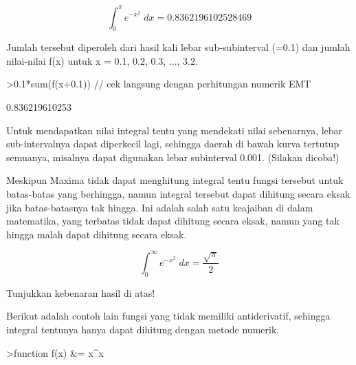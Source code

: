 \documentclass[a4paper,10pt]{article}
\begin{document}
\begin{eulernotebook}
\begin{eulercomment}
\begin{eulercomment}
\begin{eulercomment}
\begin{eulercomment}
\begin{eulercomment}
\begin{eulercomment}
\begin{eulercomment}
\begin{eulercomment}
\begin{eulercomment}
\begin{eulercomment}
\begin{eulercomment}
\begin{eulercomment}
\begin{eulercomment}
\begin{eulercomment}
\begin{eulercomment}
\begin{eulercomment}
\begin{eulercomment}
\begin{eulercomment}
\begin{eulercomment}
\begin{eulercomment}
\begin{eulercomment}
\end{eulercomment}
\begin{eulerformula}
\[
\int_{0}^{\pi}{e^ {- x^2 }\;dx}=0.8362196102528469
\]
\end{eulerformula}
\begin{eulercomment}
Jumlah tersebut diperoleh dari hasil kali lebar sub-subinterval (=0.1)
dan jumlah nilai-nilai f(x) untuk x = 0.1, 0.2, 0.3, ..., 3.2.
\end{eulercomment}
\begin{eulerprompt}
>0.1*sum(f(x+0.1)) // cek langsung dengan perhitungan numerik EMT
\end{eulerprompt}
\begin{euleroutput}
  0.836219610253
\end{euleroutput}
\begin{eulercomment}
Untuk mendapatkan nilai integral tentu yang mendekati nilai
sebenarnya, lebar sub-intervalnya dapat diperkecil lagi, sehingga
daerah di bawah kurva tertutup semuanya, misalnya dapat digunakan
lebar subinterval 0.001. (Silakan dicoba!)

Meskipun Maxima tidak dapat menghitung integral tentu fungsi tersebut
untuk batas-batas yang berhingga, namun integral tersebut dapat
dihitung secara eksak jika batas-batasnya tak hingga. Ini adalah salah
satu keajaiban di dalam matematika, yang terbatas tidak dapat dihitung
secara eksak, namun yang tak hingga malah dapat dihitung secara eksak.
\end{eulercomment}
\begin{eulerformula}
\[
\int_{0}^{\infty }{e^ {- x^2 }\;dx}=\frac{\sqrt{\pi}}{2}
\]
\end{eulerformula}
\begin{eulercomment}
Tunjukkan kebenaran hasil di atas!

Berikut adalah contoh lain fungsi yang tidak memiliki antiderivatif,
sehingga integral tentunya hanya dapat dihitung dengan metode numerik.
\end{eulercomment}
\begin{eulerprompt}
>function f(x) &= x^x
\end{eulerprompt}
\begin{euleroutput}
  

\end{euleroutput}
\end{eulercomment}
\end{eulercomment}
\end{eulercomment}
\end{eulercomment}
\end{eulercomment}
\end{eulercomment}
\end{eulercomment}
\end{eulercomment}
\end{eulercomment}
\end{eulercomment}
\end{eulercomment}
\end{eulercomment}
\end{eulercomment}
\end{eulercomment}
\end{eulercomment}
\end{eulercomment}
\end{eulercomment}
\end{eulercomment}
\end{eulercomment}
\end{eulercomment}
\end{eulernotebook}
\end{document}

